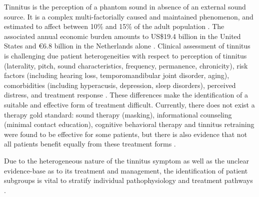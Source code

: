 \documentclass[
  oneside]{book}
\begin{document}
Tinnitus is the perception of a phantom sound in absence of an external sound source.
It is a complex multi-factorially caused and maintained phenomenon, and estimated to affect between 10\% and 15\% of the adult population \autocite{Baguley:Tinnitus2013}.
The associated annual economic burden amounts to US\$19.4 billion in the
United States \autocite{Bhatt:TinnitusAnxietyDepression2017} and €6.8 billion in the Netherlands alone \autocite{Maes:TinnitusCosts2013}.
Clinical assessment of tinnitus is challenging due patient heterogeneities with respect to perception of tinnitus (laterality, pitch, sound characteristics, frequency, permanence, chronicity), risk factors (including hearing loss, temporomandibular joint disorder, aging), comorbidities (including hyperacusis, depression, sleep disorders), perceived distress, and treatment response \autocite{Cederroth2019}.
These differences make the identification of a suitable and effective form of treatment difficult.
Currently, there does not exist a therapy gold standard: sound therapy (masking), informational counseling (minimal contact education), cognitive behavioral therapy and tinnitus retraining were found to be effective for some patients, but there is also evidence that not all patients benefit equally from these treatment forms \autocite{Hobson:SoundTherapy2012,Kroner:Counseling2003,Henry:Counseling1996,Martinez:CBTReview2007,Phillips:TRT2010}.

Due to the heterogeneous nature of the tinnitus symptom as well as the unclear
evidence-base as to its treatment and management, the identification of patient subgroups is vital to stratify individual pathophysiology and treatment pathways \autocite{Langguth:LCA2017,Tyler:TinnitusClustering2008,Landgrebe:TRI2010}.
\end{document}
